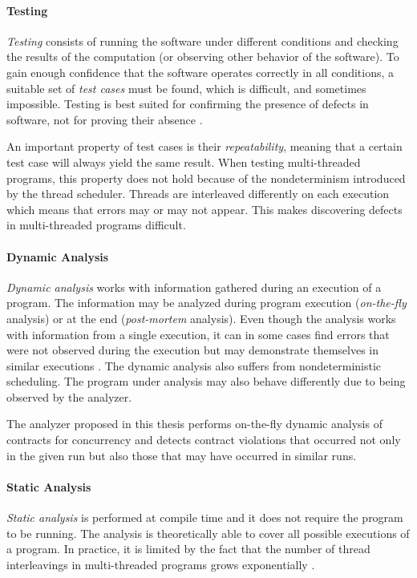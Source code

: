 \paragraph{Testing}
\emph{Testing} consists of running the software under different conditions and
checking the results of the computation (or observing other behavior of the
software). To gain enough confidence that the software operates correctly in all
conditions, a suitable set of \emph{test cases} must be found, which is
difficult, and sometimes impossible. Testing is best suited for confirming
the presence of defects in software, not for proving their absence
\cite{fundamentals}.

An important property of test cases is their \emph{repeatability}, meaning that
a certain test case will always yield the same result. When testing
multi-threaded programs, this property does not hold because of the
nondeterminism introduced by the thread scheduler. Threads are interleaved
differently on each execution which means that errors may or may not appear.
This makes discovering defects in multi-threaded programs difficult.

\paragraph{Dynamic Analysis}
\emph{Dynamic analysis} works with information gathered during an execution of a
program. The information may be analyzed during program execution
(\emph{on-the-fly} analysis) or at the end (\emph{post-mortem} analysis). Even
though the analysis works with information from a single execution, it can in
some cases find errors that were not observed during the execution but may
demonstrate themselves in similar executions \cite{letko}. The dynamic analysis
also suffers from nondeterministic scheduling. The program under analysis may
also behave differently due to being observed by the analyzer.

The analyzer proposed in this thesis performs on-the-fly dynamic analysis of
contracts for concurrency and detects contract violations that occurred not only
in the given run but also those that may have occurred in similar runs.

\paragraph{Static Analysis}
\emph{Static analysis} is performed at compile time and it does not require the
program to be running. The analysis is theoretically able to cover all possible
executions of a program. In practice, it is limited by the fact that the number
of thread interleavings in multi-threaded programs grows exponentially
\cite{letko}.

